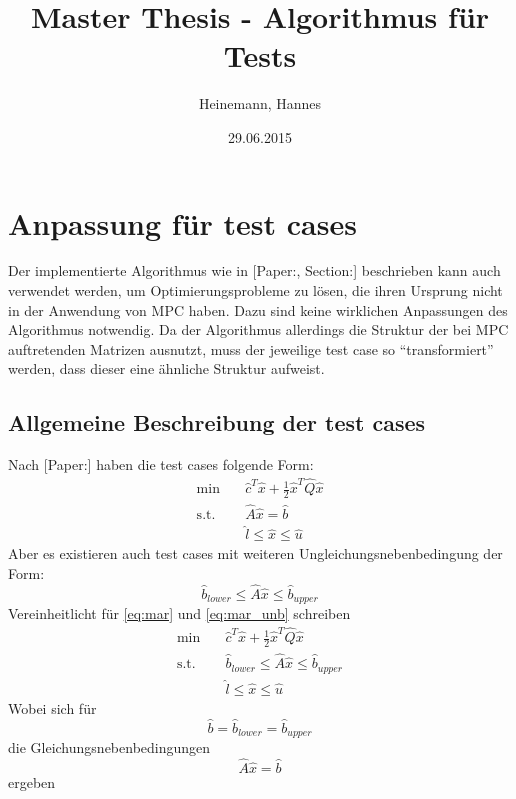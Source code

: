 \documentclass[a4paper,10pt]{scrartcl}
\title{Master Thesis - Algorithmus für Tests}
\author{Heinemann, Hannes}
\date{29.06.2015}
\begin{document}
\maketitle
\section{Anpassung für test cases}%
\label{sec:testcases}
Der implementierte Algorithmus wie in [Paper:, Section:] beschrieben kann auch verwendet werden, um Optimierungsprobleme zu lösen, die ihren Ursprung nicht in der Anwendung von MPC haben. Dazu sind keine wirklichen Anpassungen des Algorithmus notwendig. Da der Algorithmus allerdings die Struktur der bei MPC auftretenden Matrizen ausnutzt, muss der jeweilige test case so ``transformiert'' werden, dass dieser eine ähnliche Struktur aufweist.
\subsection{Allgemeine Beschreibung der test cases}%
\label{sec:beschreibungtestcases}
Nach [Paper:] haben die test cases folgende Form:
\begin{equation}\begin{split}
  \label{eq:mar}
  \min \quad &\hat{c}^{T}\hat{x}+\frac{1}{2}\hat{x}^{T}\hat{Q}\hat{x}\\
  \text{s.t.} \quad &\hat{A} \hat{x} = \hat{b}\\
  \quad &\hat{l} \leq \hat{x} \leq \hat{u} 
\end{split}\end{equation}
Aber es existieren auch test cases mit weiteren Ungleichungsnebenbedingung der Form:
\begin{equation}
  \label{eq:mar_unb}
  \hat{b}_{lower} \leq \hat{A} \hat{x} \leq \hat{b}_{upper}
\end{equation}
Vereinheitlicht für \ref{eq:mar} und \ref{eq:mar_unb} schreiben
\begin{equation}\begin{split}
  \min \quad &\hat{c}^{T}\hat{x}+\frac{1}{2}\hat{x}^{T}\hat{Q}\hat{x}\\
  \text{s.t.} \quad &\hat{b}_{lower} \leq \hat{A} \hat{x} \leq \hat{b}_{upper}\\
  \quad &\hat{l} \leq \hat{x} \leq \hat{u} 
\end{split}\end{equation}
Wobei sich für 
\begin{equation*}
  \hat{b} = \hat{b}_{lower} = \hat{b}_{upper}
\end{equation*}
die Gleichungsnebenbedingungen
\begin{equation*}
  \hat{A} \hat{x} = \hat{b}
\end{equation*}
ergeben
\end{document}
